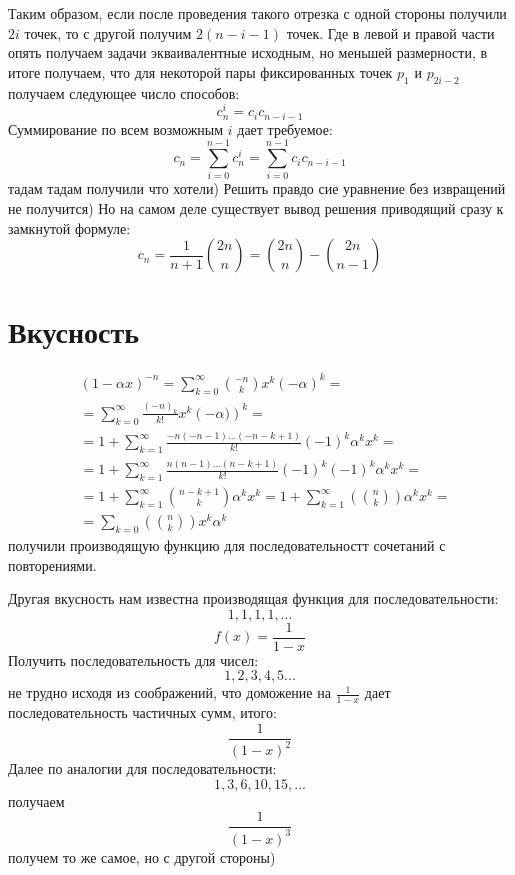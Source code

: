 Таким образом, если после проведения такого отрезка с одной стороны получили $2 i$ точек, то с другой получим $2 \left(n - i - 1\right)$ точек. Где в левой и правой части опять получаем задачи экваивалентные исходным, но меньшей размерности, в итоге получаем, что для некоторой пары фиксированных точек $p_1$ и $p_{2 i - 2}$ получаем следующее число способов:
\[
	c_{n}^i = c_i c_{n-i-1}
\]
Суммирование по всем возможным $i$ дает требуемое:
\[
	c_{n} = \sum_{i=0}^{n-1} c_{n}^i = \sum_{i=0}^{n-1} c_i c_{n-i-1}
\]
тадам тадам получили что хотели) Решить правдо сие уравнение без извращений не получится) Но на самом деле существует вывод решения приводящий сразу к замкнутой формуле:
\[
	c_{n} = \frac{1}{n+1} \binom{2n}{n} = \binom{2n}{n} - \binom{2n}{n-1}
\]

\section{Вкусность}
\[
	\begin{split}
		& \left(1 - \alpha x\right)^{-n} = \sum_{k=0}^{\infty} \binom{-n}{k} x^k \left(-\alpha\right)^k = \\
		& =  \sum_{k=0}^{\infty} \frac{\left(-n\right)_k}{k!} x^k \left(-\alpha)\right)^k = \\
		& = 1 + \sum_{k=1}^{\infty} \frac{-n \left(-n - 1\right) ... \left(- n - k + 1\right)}{k!} \left(-1\right)^k \alpha^k x^k = \\
		& = 1 + \sum_{k=1}^{\infty} \frac{n\left(n-1\right)...\left(n-k+1\right)}{k!} \left(-1\right)^k \left(-1\right)^k \alpha^k x^k = \\
		& = 1 + \sum_{k=1}^{\infty} \binom{n-k+1}{k} \alpha^k x^k = 1 + \sum_{k=1}^{\infty} \left(\binom{n}{k}\right) \alpha^k x^k = \\
		& = \sum_{k=0} \left(\binom{n}{k}\right) x^k \alpha^k
	\end{split}
\]
получили производящую функцию для последовательностт сочетаний с повторениями.

Другая вкусность нам известна производящая функция для последовательности:
\[
	1, 1, 1, 1, ...
\]
\[
	f\left(x\right) = \frac{1}{1 - x}
\]
Получить последовательность для чисел:
\[
	1, 2, 3, 4, 5 ...
\]
не трудно исходя из соображений, что доможение на $\frac{1}{1-x}$ дает последовательность частичных сумм, итого:
\[
	\frac{1}{\left(1-x\right)^2}
\]
Далее по аналогии для последовательности:
\[
	1, 3, 6, 10, 15, ...
\]
получаем
\[
	\frac{1}{\left(1-x\right)^3}
\]
получем то же самое, но с другой стороны)
